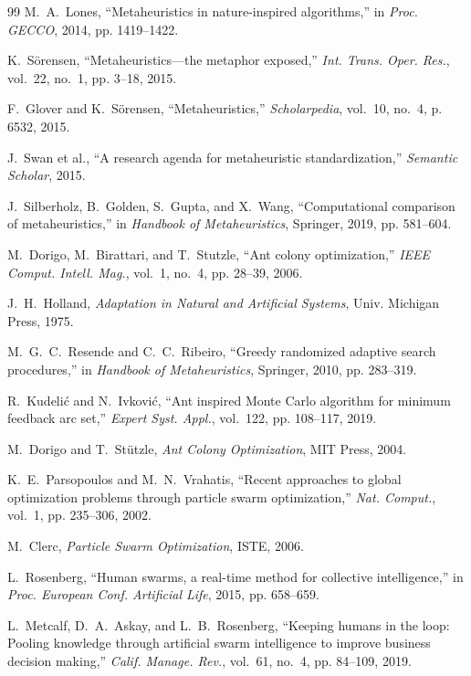 \documentclass[letterpaper, 10pt, conference]{IEEEtran}
\begin{document}
\begin{thebibliography}{99}
M.~A.~Lones, ``Metaheuristics in nature-inspired algorithms,'' in \emph{Proc. GECCO}, 2014, pp. 1419--1422.

K.~Sörensen, ``Metaheuristics—the metaphor exposed,'' \emph{Int. Trans. Oper. Res.}, vol.~22, no.~1, pp. 3--18, 2015.

F.~Glover and K.~Sörensen, ``Metaheuristics,'' \emph{Scholarpedia}, vol.~10, no.~4, p. 6532, 2015.

J.~Swan et al., ``A research agenda for metaheuristic standardization,'' \emph{Semantic Scholar}, 2015.

J.~Silberholz, B.~Golden, S.~Gupta, and X.~Wang, ``Computational comparison of metaheuristics,'' in \emph{Handbook of Metaheuristics}, Springer, 2019, pp. 581--604.

M.~Dorigo, M.~Birattari, and T.~Stutzle, ``Ant colony optimization,'' \emph{IEEE Comput. Intell. Mag.}, vol.~1, no.~4, pp. 28--39, 2006.

J.~H.~Holland, \emph{Adaptation in Natural and Artificial Systems}, Univ. Michigan Press, 1975.

M.~G.~C.~Resende and C.~C.~Ribeiro, ``Greedy randomized adaptive search procedures,'' in \emph{Handbook of Metaheuristics}, Springer, 2010, pp. 283--319.

R.~Kudelić and N.~Ivković, ``Ant inspired Monte Carlo algorithm for minimum feedback arc set,'' \emph{Expert Syst. Appl.}, vol.~122, pp. 108--117, 2019.

M.~Dorigo and T.~Stützle, \emph{Ant Colony Optimization}, MIT Press, 2004.

K.~E.~Parsopoulos and M.~N.~Vrahatis, ``Recent approaches to global optimization problems through particle swarm optimization,'' \emph{Nat. Comput.}, vol.~1, pp. 235--306, 2002.

M.~Clerc, \emph{Particle Swarm Optimization}, ISTE, 2006.

L.~Rosenberg, ``Human swarms, a real-time method for collective intelligence,'' in \emph{Proc. European Conf. Artificial Life}, 2015, pp. 658--659.

L.~Metcalf, D.~A.~Askay, and L.~B.~Rosenberg, ``Keeping humans in the loop: Pooling knowledge through artificial swarm intelligence to improve business decision making,'' \emph{Calif. Manage. Rev.}, vol.~61, no.~4, pp. 84--109, 2019.


\end{thebibliography}
\end{document}
